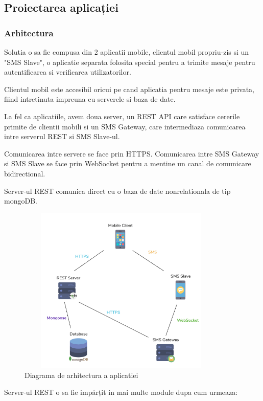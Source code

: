 \documentclass[12pt]{article}
\begin{document}
\newpage
\subsection{Proiectarea aplicației}
\subsubsection{Arhitectura}

Solutia o sa fie compusa din 2 aplicatii mobile, clientul mobil propriu-zis
si un "SMS Slave", o aplicatie separata folosita special pentru a trimite mesaje
pentru autentificarea si verificarea utilizatorilor.

Clientul mobil este accesibil oricui pe cand aplicatia pentru mesaje este privata,
fiind intretinuta impreuna cu serverele si baza de date.

La fel ca aplicatiile, avem doua server, un REST API care satisface cererile primite
de clientii mobili si un SMS Gateway, care intermediaza comunicarea intre serverul REST
si SMS Slave-ul.

Comunicarea intre servere se face prin HTTPS.
Comunicarea intre SMS Gateway si SMS Slave se face prin WebSocket pentru a mentine
un canal de comunicare bidirectional.

Server-ul REST comunica direct cu o baza de date  nonrelationala de tip mongoDB.

\begin{figure}[H]
    \centering
    \includegraphics[width=10cm, height=8cm]{arhi.png}
    \caption{Diagrama de arhitectura a aplicatiei}
    \end{figure}

\newpage
Server-ul REST o sa fie impărțit in mai multe module dupa cum urmeaza:
\end{document}
